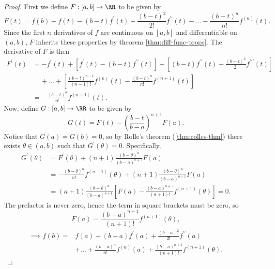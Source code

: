 \documentclass[../real_analysis.tex]{subfiles}
\begin{document}
            \begin{proof}
                First we define $F:[a,b]\to\RR$ to be given by
                \begin{equation}
                    F(t)=f(b)-f(t)-(b-t)f^\prime(t)-\frac{(b-t)^2}{2!}f^{\prime\prime}(t)-\dots-\frac{(b-t)^n}{n!}f^{(n)}(t).
                \end{equation}
                Since the first $n$ derivatives of $f$ are continuous on $[a,b]$ and differentiable on $(a,b)$, $F$ inherits these properties by theorem \ref{thm:diff-func-props}. The derivative of $F$ is then
                \begin{align}
                    F^\prime(t)&=-f^\prime(t)+[f^\prime(t)-(b-t)f^{\prime\prime}(t)]+\left[(b-t)f^{\prime\prime}(t)-\frac{(b-t)^2}{2!}f^{\prime\prime\prime}(t)\right]\\
                    &\quad\,+\dots+\left[\frac{(b-t)^{n-1}}{(n-1)!}f^{(n)}(t)-\frac{(b-t)^n}{n!}f^{(n+1)}(t)\right]\\
                    &=-\frac{(b-t)^n}{n!}f^{(n+1)}(t).
                \end{align}
                Now, define $G:[a,b]\to\RR$ to be given by
                \begin{equation}
                    G(t)=F(t)-\left(\frac{b-t}{b-a}\right)^{n+1}F(a).
                \end{equation}
                Notice that $G(a)=G(b)=0$, so by Rolle's theorem (\ref{thm:rolles-thm}) there exists $\theta\in(a,b)$ such that $G^\prime(\theta)=0$. Specifically,
                \begin{align}
                    G^\prime(\theta)&=F^\prime(\theta)+(n+1)\frac{(b-\theta)^n}{(b-a)^{n+1}}F(a)\\
                    &=-\frac{(b-\theta)^n}{n!}f^{(n+1)}(\theta)+(n+1)\frac{(b-\theta)^n}{(b-a)^{n+1}}F(a)\\
                    &=(n+1)\frac{(b-\theta)^n}{(b-a)^{n+1}}\left[F(a)-\frac{(b-a)^{n+1}}{(n+1)!}f^{(n+1)}(\theta)\right]=0.
                \end{align}
                The prefactor is never zero, hence the term in square brackets must be zero, so
                \begin{equation}
                    F(a)=\frac{(b-a)^{n+1}}{(n+1)!}f^{(n+1)}(\theta),
                \end{equation}
                \begin{align}
                    \implies f(b)=&f(a)+(b-a)f^\prime(a)+\frac{(b-a)^2}{2!}f^{\prime\prime}(a)\\
                    &+\dots+\frac{(b-a)^n}{n!}f^{(n)}(a)+\frac{(b-a)^{n+1}}{(n+1)!}f^{(n+1)}(\theta).
                \end{align}
            \end{proof}
\end{document}
